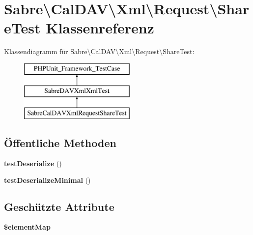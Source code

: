\hypertarget{class_sabre_1_1_cal_d_a_v_1_1_xml_1_1_request_1_1_share_test}{}\section{Sabre\textbackslash{}Cal\+D\+AV\textbackslash{}Xml\textbackslash{}Request\textbackslash{}Share\+Test Klassenreferenz}
\label{class_sabre_1_1_cal_d_a_v_1_1_xml_1_1_request_1_1_share_test}
Klassendiagramm für Sabre\textbackslash{}Cal\+D\+AV\textbackslash{}Xml\textbackslash{}Request\textbackslash{}Share\+Test\+:\begin{figure}[H]
\begin{center}
\leavevmode
\includegraphics[height=3.000000cm]{class_sabre_1_1_cal_d_a_v_1_1_xml_1_1_request_1_1_share_test}
\end{center}
\end{figure}
\subsection*{Öffentliche Methoden}
\begin{DoxyCompactItemize}
\item 
\mbox{\label{class_sabre_1_1_cal_d_a_v_1_1_xml_1_1_request_1_1_share_test_a55a7801d1a938c2e7d1cae78138a27c6}} 
{\bfseries test\+Deserialize} ()
\item 
\mbox{\label{class_sabre_1_1_cal_d_a_v_1_1_xml_1_1_request_1_1_share_test_a59178654c8f5491d081dd6fcaff7e11c}} 
{\bfseries test\+Deserialize\+Minimal} ()
\end{DoxyCompactItemize}
\subsection*{Geschützte Attribute}
\begin{DoxyCompactItemize}
\item 
{\bfseries \$element\+Map}
\end{DoxyCompactItemize}



